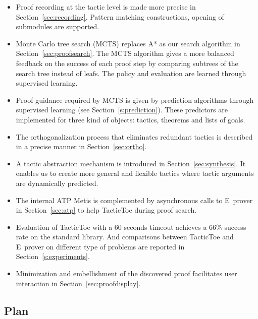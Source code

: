 \documentclass[runningheads,a4paper,draft]{svjour3}
\def\eprover{\textsf{E~prover}\xspace}
\def\sml{\textsf{SML}\xspace}
\def\metis{\textsf{Metis}\xspace}
\def\tactictoe{\textsf{TacticToe}\xspace}
\begin{document}
\begin{itemize}
\item Proof recording at the tactic level is made more precise in 
Section~\ref{sec:recording}. Pattern
matching constructions, opening of submodules are supported. 
\item Monte Carlo tree search (MCTS) replaces A* as our
search algorithm in Section~\ref{sec:proofsearch}. The MCTS algorithm gives a 
more balanced feedback on
the success of
each proof step by
comparing subtrees of the search tree instead of leafs. The policy and
evaluation are learned
through supervised learning.
\item Proof guidance required by MCTS is given by prediction algorithms 
through supervised learning (see 
Section~\ref{s:prediction}).
These predictors are implemented for three kind of objects: tactics, 
theorems and lists of goals.
\item The orthogonalization process that eliminates redundant tactics is
described in a precise manner in Section~\ref{sec:ortho}.
\item A tactic abstraction mechanism is introduced in 
Section~\ref{sec:synthesis}. It enables us to create
more general and flexible tactics where tactic arguments are dynamically
predicted.
\item The internal ATP \metis is complemented
by asynchronous calls to \eprover in Section~\ref{sec:atp} to help \tactictoe 
during proof search.
\item Evaluation of \tactictoe with a 60 seconds timeout achieves a 66\%
success rate on the standard library. And comparisons between 
\tactictoe and \eprover on different type of problems are reported in 
Section~\ref{s:experiments}.
\item Minimization and embellishment of the discovered proof facilitates user
interaction in Section~\ref{sec:proofdisplay}.
\end{itemize}

\subsection{Plan}
\end{document}
